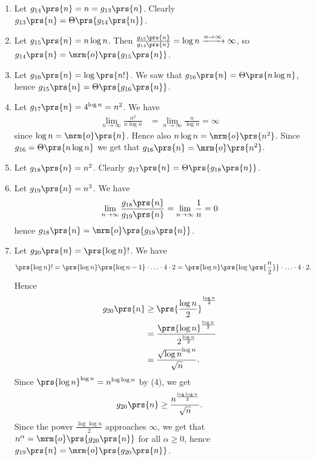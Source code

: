 \documentclass[oneside]{scrbook}
\theoremstyle{definition}
\begin{document}
\begin{problem}
\begin{enumerate}[label=\alph*.]
\begin{enumerate}[label=\arabic*.]
\item Let $g_{14}\prs{n} = n = g_{13}\prs{n}$. Clearly $g_{13}\prs{n} = \Theta\prs{g_{14}\prs{n}}$.

\item Let $g_{15}\prs{n} = n \log n$. Then $\frac{g_{15}\prs{n}}{g_{14}\prs{n}} = \log n \xrightarrow{n\to \infty} \infty$, so $g_{14}\prs{n} = \mrm{o}\prs{g_{15}\prs{n}}$.

\item Let $g_{16}\prs{n} = \log\prs{n!}$. We saw that $g_{16}\prs{n} = \Theta\prs{n \log n}$, hence $g_{15}\prs{n} = \Theta\prs{g_{16}\prs{n}}$.

\item Let $g_{17}\prs{n} = 4^{\log n} = n^2$. We have
\begin{align*}
\lim_{n \to \infty} \frac{n^2}{n \log n} &= \lim_{n \to \infty} \frac{n}{\log n} = \infty
\end{align*}
since $\log n = \mrm{o}\prs{n}$.
Hence also
$n \log n = \mrm{o}\prs{n^2}$. Since $g_{16} = \Theta\prs{n \log n}$ we get that $g_{16}\prs{n} = \mrm{o}\prs{n^2}$.


\item Let $g_{18}\prs{n} = n^2$. Clearly $g_{17}\prs{n} = \Theta\prs{g_{18}\prs{n}}$.

\item Let $g_{19}\prs{n} = n^3$. We have
\begin{align*}
\lim_{n \to \infty} \frac{g_{18}\prs{n}}{g_{19}\prs{n}} = \lim_{n\to\infty} \frac{1}{n} = 0
\end{align*}
hence $g_{18}\prs{n} = \mrm{o}\prs{g_{19}\prs{n}}$.

\item Let $g_{20}\prs{n} = \prs{\log n}!$.
We have
\begin{align*}
\prs{\log n}! &= \prs{\log n} \prs{\log n - 1} \cdot \ldots \cdot 4 \cdot 2 = \prs{\log n}\prs{\log\prs{\frac{n}{2}}} \cdot \ldots \cdot 4 \cdot 2 \text{.}
\end{align*}
Hence
\begin{align*}
g_{20}\prs{n} &\geq \prs{\frac{\log n}{2}}^{\frac{\log n}{2}}
\\&=
\frac{\prs{\log n}^{\frac{\log n}{2}}}{2^{\frac{\log n}{2}}}
\\&=
\frac{\sqrt{\log n}^{\log n}}{\sqrt{n}} \text{.}
\end{align*}
Since $\prs{\log n}^{\log n} = n^{\log \log n}$ by (4), we get
\begin{align*}
g_{20}\prs{n} \geq \frac{n^{\frac{\log \log n}{2}}}{\sqrt{n}} \text{.}
\end{align*}
Since the power $\frac{\log \log n}{2}$ approaches $\infty$, we get that $n^{\alpha} = \mrm{o}\prs{g_{20}\prs{n}}$ for all $\alpha \geq 0$, hence $g_{19}\prs{n} = \mrm{o}\prs{g_{20}\prs{n}}$.



\end{enumerate}
\end{enumerate}
\end{problem}
\end{document}
